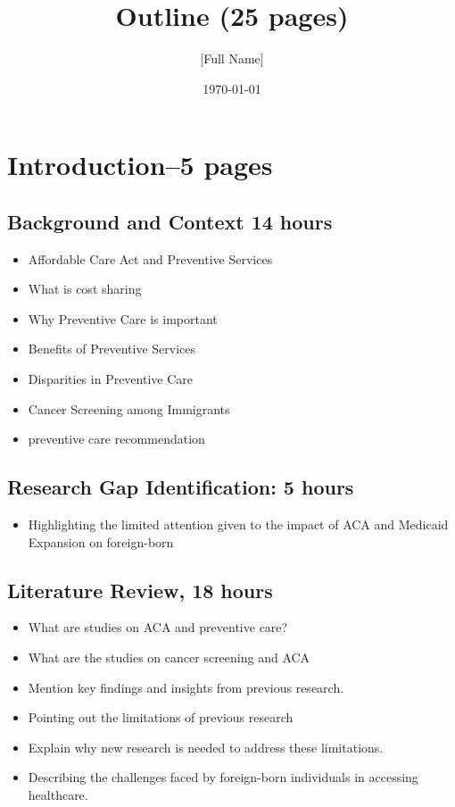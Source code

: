 \documentclass[10pt, oneside]{article}
\title{Outline (25 pages)}
\author{[Full Name]}
\date{\today}
\begin{document}
\maketitle

\vspace{.25in}


\section{Introduction--5 pages}
\subsection {Background and Context 14 hours}
\begin{itemize}
\item Affordable Care Act and Preventive Services
\item What is cost sharing
\item Why Preventive Care is important
\item Benefits of Preventive Services
\item Disparities in Preventive Care 
\item Cancer Screening among Immigrants
\item preventive care recommendation

\end{itemize}


\subsection{Research Gap Identification: 5 hours}
\begin{itemize}
\item Highlighting the limited attention given to the impact of ACA and Medicaid Expansion on foreign-born 
\end{itemize}


\subsection{Literature Review, 18 hours}


\begin{itemize}
\item What are studies on ACA and preventive care? 
\item What are the studies on cancer screening and ACA
\item Mention key findings and insights from previous research.
\item Pointing out the limitations of previous research
\item Explain why new research is needed to address these limitations.
\item Describing the challenges faced by foreign-born individuals in accessing healthcare.
\end{itemize}
\end{document}
